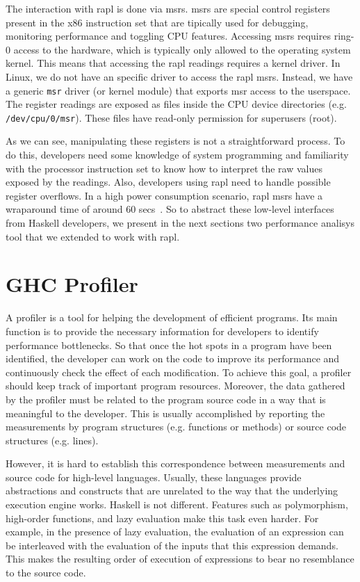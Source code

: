 The interaction with \acs{rapl} is done via \acp{msr}. \acp{msr} are special control registers present in the x86 instruction set that are tipically used for debugging, monitoring performance and toggling CPU features. Accessing \acp{msr} requires ring-0 access to the hardware, which is typically only allowed to the operating system kernel. This means that accessing the \ac{rapl} readings requires a kernel driver. In Linux, we do not have an specific driver to access the \ac{rapl} \acp{msr}. Instead, we have a generic \texttt{msr} driver (or kernel module) that exports \ac{msr} access to the userspace. The register readings are exposed as files inside the CPU device directories (e.g. \texttt{/dev/cpu/0/msr}). These files have read-only permission for superusers (root).

As we can see, manipulating these registers is not a straightforward process. To do this, developers need some knowledge of system programming and familiarity with the processor instruction set to know how to interpret the raw values exposed by the readings. Also, developers using \ac{rapl} need to handle possible register overflows. In a high power consumption scenario, \ac{rapl} \acp{msr} have a wraparound time of around 60 secs~\citep{intel:2016}. So to abstract these low-level interfaces from Haskell developers, we present in the next sections two performance analisys tool that we extended to work with \ac{rapl}.


\section{GHC Profiler}\label{sec:profiler}
A profiler is a tool for helping the development of efficient programs. Its main function is to provide the necessary information for developers to identify performance bottlenecks. So that once the hot spots in a program have been identified, the developer can work on the code to improve its performance and continuously check the effect of each modification. To achieve this goal, a profiler should keep track of important program resources. Moreover, the data gathered by the profiler must be related to the program source code in a way that is meaningful to the developer. This is usually accomplished by reporting the measurements by program structures (e.g. functions or methods) or source code structures (e.g. lines).

However, it is hard to establish this correspondence between measurements and source code for high-level languages. Usually, these languages provide abstractions and constructs that are unrelated to the way that the underlying execution engine works. Haskell is not different. Features such as polymorphism, high-order functions, and lazy evaluation make this task even harder. For example, in the presence of lazy evaluation, the evaluation of an expression can be interleaved with the evaluation of the inputs that this expression demands. This makes the resulting order of execution of expressions to bear no resemblance to the source code.

